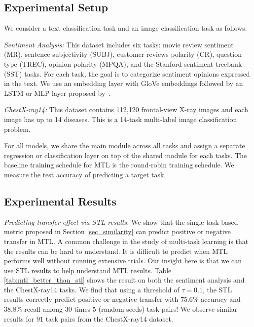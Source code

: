 \subsection{Experimental Setup}

We consider a text classification task and an image classification task as follows.

{\it Sentiment Analysis:} This dataset includes six tasks: movie review sentiment (MR), sentence subjectivity (SUBJ), customer reviews polarity (CR), question type (TREC), opinion polarity (MPQA), and the Stanford sentiment treebank (SST) tasks.
{For each task, the goal is to categorize sentiment opinions expressed in the text.
We use an embedding layer with GloVe embeddings
followed by an LSTM or MLP layer proposed by~\cite{lei2018simple}.
}

{\it ChestX-ray14:} This dataset contains 112,120 frontal-view X-ray images and each image has up to 14 diseases.
This is a 14-task multi-label image classification problem.


For all models, we share the main module across all tasks and assign a separate regression or classification layer on top of the shared module for each tasks.
The baseline training schedule for MTL is the round-robin training schedule.
We measure the test accuracy of predicting a target task.


\subsection{Experimental Results}

\textit{Predicting transfer effect via STL results.}
We show that the single-task based metric proposed in Section \ref{sec_similarity} can predict positive or negative transfer in MTL.
A common challenge in the study of multi-task learning is that the results can be hard to understand.
It is difficult to predict when MTL performs well without running extensive trials.
Our insight here is that we can use STL results to help understand MTL results.
Table \ref{tab:mtl_better_than_stl} shows the result on both the sentiment analysis and the ChestX-ray14 tasks.
We find that using a threshold of $\tau = 0.1$, the STL results correctly predict positive or negative transfer with $75.6\%$ accuracy and $38.8\%$ recall among $30$ times $5$ (random seeds) task pairs!
We observe similar results for $91$ task pairs from the ChestX-ray14 dataset.

